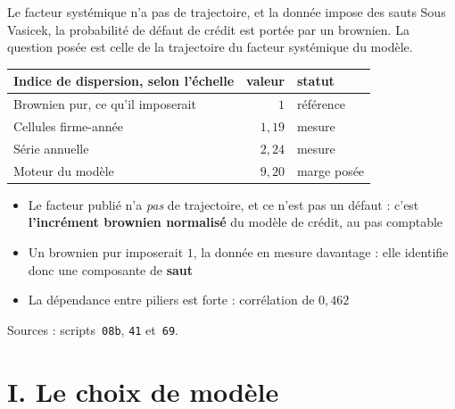 \documentclass[11pt]{beamer}
\begin{document}
\begin{frame}{Le facteur systémique n'a pas de trajectoire, et la donnée impose des sauts}
\small
Sous Vasicek, la probabilité de défaut de crédit est portée par un brownien. La question posée
est celle de la trajectoire du facteur systémique du modèle.
\vspace{1mm}

\begin{center}\small
\begin{tabular}{@{}l r l@{}}
\toprule
\textbf{Indice de dispersion, selon l'échelle} & \textbf{valeur} & \textbf{statut} \\
\midrule
Brownien pur, ce qu'il imposerait & $1$ & référence \\
Cellules firme-année & $1{,}19$ & mesure \\
Série annuelle & $2{,}24$ & mesure \\
Moteur du modèle & $9{,}20$ & marge posée \\
\bottomrule
\end{tabular}
\end{center}
\vspace{2mm}

\begin{itemize}\itemsep4pt
  \item Le facteur publié n'a \emph{pas} de trajectoire, et ce n'est pas un défaut : c'est
        \textbf{l'incrément brownien normalisé} du modèle de crédit, au pas comptable
  \item \alert{Un brownien pur imposerait $1$, la donnée en mesure davantage} : elle identifie
        donc une composante de \textbf{saut}
  \item La dépendance entre piliers est forte : corrélation de $0{,}462$
\end{itemize}
\vspace{1mm}
{\scriptsize Sources : scripts~\texttt{08b}, \texttt{41} et~\texttt{69}.}
\end{frame}

\section*{I. Le choix de modèle}
\end{document}

